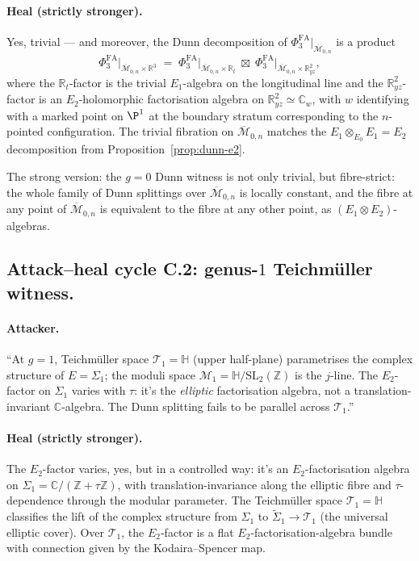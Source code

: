 \documentclass[11pt]{article}
\newcommand{\Eone}{E_{1}}
\newcommand{\Etwo}{E_{2}}
\newcommand{\PhiFA}{\Phi^{\mathrm{FA}}}
\newcommand{\R}{\mathbb{R}}
\newcommand{\C}{\mathbb{C}}
\newcommand{\Z}{\mathbb{Z}}
\newcommand{\cM}{\mathcal{M}}
\newcommand{\cT}{\mathcal{T}}
\begin{document}
\paragraph{Heal (strictly stronger).}
Yes, trivial --- and moreover, the Dunn decomposition of
$\PhiFA_3|_{\overline{\cM}_{0, n}}$ is a product
\[
  \PhiFA_3\bigl|_{\overline{\cM}_{0, n} \times \R^3}
  \;=\;
  \PhiFA_3\bigl|_{\overline{\cM}_{0, n} \times \R_t}
  \;\boxtimes\;
  \PhiFA_3\bigl|_{\overline{\cM}_{0, n} \times \R^2_{yz}},
\]
where the $\R_t$-factor is the trivial $\Eone$-algebra on the
longitudinal line and the $\R^2_{yz}$-factor is an
$\Etwo$-holomorphic factorisation algebra on $\R^2_{yz} \simeq \C_w$,
with $w$ identifying with a marked point on $\P^1$ at the boundary
stratum corresponding to the $n$-pointed configuration. The trivial
fibration on $\overline{\cM}_{0, n}$ matches the $\Eone
\otimes_{E_0} \Eone = \Etwo$ decomposition from
Proposition~\ref{prop:dunn-e2}.

The strong version: the $g = 0$ Dunn witness is not only trivial, but
fibre-strict: the whole family of Dunn splittings over
$\overline{\cM}_{0, n}$ is locally constant, and the fibre at any
point of $\overline{\cM}_{0, n}$ is equivalent to the fibre at any
other point, as $(\Eone \otimes \Etwo)$-algebras.

\subsection{Attack--heal cycle C.2: genus-$1$ Teichm\"uller witness.}

\paragraph{Attacker.}
``At $g = 1$, Teichm\"uller space $\cT_1 = \mathbb H$ (upper half-plane)
parametrises the complex structure of $E = \Sigma_1$; the moduli space
$\cM_1 = \mathbb H / \mathrm{SL}_2(\Z)$ is the $j$-line. The
$\Etwo$-factor on $\Sigma_1$ varies with $\tau$: it's the
\emph{elliptic} factorisation algebra, not a translation-invariant
$\C$-algebra. The Dunn splitting fails to be parallel across $\cT_1$.''

\paragraph{Heal (strictly stronger).}
The $\Etwo$-factor varies, yes, but in a controlled way: it's an
$\Etwo$-factorisation algebra on $\Sigma_1 = \C / (\Z + \tau\Z)$,
with translation-invariance along the elliptic fibre and
$\tau$-dependence through the modular parameter. The Teichm\"uller
space $\cT_1 = \mathbb H$ classifies the lift of the complex structure
from $\Sigma_1$ to $\tilde\Sigma_1 \to \cT_1$ (the universal elliptic
cover). Over $\cT_1$, the $\Etwo$-factor is a
flat $\Etwo$-factorisation-algebra bundle with connection given by the
Kodaira--Spencer map.
\end{document}
